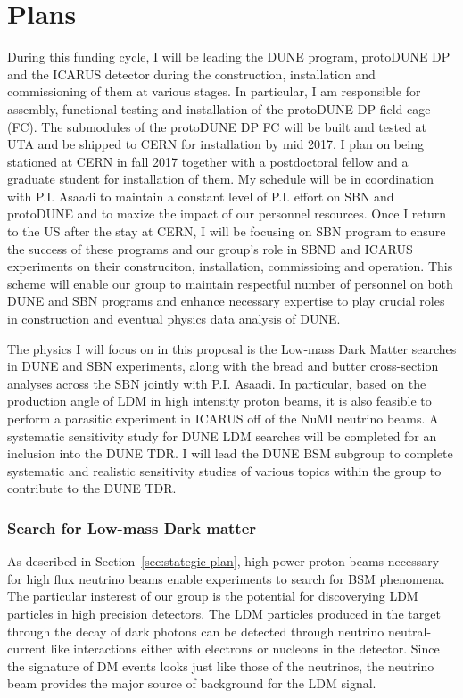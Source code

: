 \section*{\textbf{Plans}}
During this funding cycle, I will be leading the DUNE program, protoDUNE DP and the ICARUS detector during the construction, installation and commissioning of them at various stages. In particular, I am responsible for assembly, functional testing and installation of the protoDUNE DP field cage (FC).  The submodules of the protoDUNE DP FC will be built and tested at UTA and be shipped to CERN for installation by mid 2017.  I plan on being stationed at CERN in fall 2017 together with a postdoctoral fellow and a graduate student for installation of them.  My schedule will be in coordination with P.I. Asaadi to maintain a constant level of P.I. effort on SBN and protoDUNE and to maxize the impact of our personnel resources.  Once I return to the US after the stay at CERN, I will be focusing on SBN program to ensure the success of these programs and our group's role in SBND and ICARUS experiments on their construciton, installation, commissioing and operation.  This scheme will enable our group to maintain respectful number of personnel on both DUNE and SBN programs and enhance necessary expertise to play crucial roles in construction and eventual physics data analysis of DUNE.

The physics I will focus on in this proposal is the Low-mass Dark Matter searches in DUNE and SBN experiments, along with the bread and butter cross-section analyses across the SBN jointly with P.I. Asaadi.  In particular, based on the production angle of LDM in high intensity proton beams, it is also feasible to perform a parasitic experiment in ICARUS off of the NuMI neutrino beams.   A systematic sensitivity study for DUNE LDM searches will be completed for an inclusion into the DUNE TDR.  I will lead the DUNE BSM subgroup to complete systematic and realistic sensitivity studies of various topics within the group to contribute to the DUNE TDR.
\subsubsection{ Search for Low-mass Dark matter}
As described in Section~\ref{sec:stategic-plan}, high power proton beams necessary for high flux neutrino beams enable experiments to search for BSM phenomena.  The particular insterest of our group is the potential for discoverying LDM particles in high precision detectors. The LDM particles produced in the target through the decay of dark photons can be detected through neutrino neutral-current like interactions either with electrons or nucleons in the detector. Since the signature of DM events looks just like those of the neutrinos, the neutrino beam provides the major source of background for the LDM signal. 

